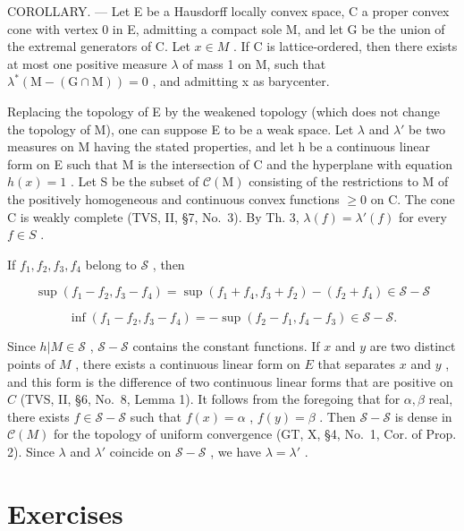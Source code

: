 COROLLARY. --- Let E be a Hausdorff locally convex space, C a proper convex cone with vertex 0 in E, admitting a compact sole M, and let G be the union of the extremal generators of C. Let \(x \in M\) . If C is lattice-ordered, then there exists at most one positive measure \(\lambda\) of mass 1 on M, such that \(\lambda^{*}(\mathrm{M} - (\mathrm{G} \cap \mathrm{M})) = 0\) , and admitting x as barycenter.

Replacing the topology of E by the weakened topology (which does not change the topology of M), one can suppose E to be a weak space. Let \(\lambda\) and \(\lambda'\) be two measures on M having the stated properties, and let h be a continuous linear form on E such that M is the intersection of C and the hyperplane with equation \(h(x)=1\) . Let S be the subset of \(\mathcal{C}(\mathrm{M})\) consisting of the restrictions to M of the positively homogeneous and continuous convex functions \(\geqslant0\) on C. The cone C is weakly complete (TVS, II, §7, No.~3). By Th. 3, \(\lambda(f)=\lambda'(f)\) for every \(f\in S\) .

If \(f_{1}, f_{2}, f_{3}, f_{4}\) belong to \(\mathcal{S}\) , then

\[
\sup \left(f _ {1} - f _ {2}, f _ {3} - f _ {4}\right) = \sup \left(f _ {1} + f _ {4}, f _ {3} + f _ {2}\right) - \left(f _ {2} + f _ {4}\right) \in \mathscr {S} - \mathscr {S}
\]

\[
\inf \left(f _ {1} - f _ {2}, f _ {3} - f _ {4}\right) = - \sup \left(f _ {2} - f _ {1}, f _ {4} - f _ {3}\right) \in \mathscr {S} - \mathscr {S}.
\]

Since \(h|M \in \mathcal{S}\) , \(\mathcal{S} - \mathcal{S}\) contains the constant functions. If \(x\) and \(y\) are two distinct points of \(M\) , there exists a continuous linear form on \(E\) that separates \(x\) and \(y\) , and this form is the difference of two continuous linear forms that are positive on \(C\) (TVS, II, §6, No.~8, Lemma 1). It follows from the foregoing that for \(\alpha, \beta\) real, there exists \(f \in \mathcal{S} - \mathcal{S}\) such that \(f(x) = \alpha\) , \(f(y) = \beta\) . Then \(\mathcal{S} - \mathcal{S}\) is dense in \(\mathcal{C}(M)\) for the topology of uniform convergence (GT, X, §4, No.~1, Cor. of Prop. 2). Since \(\lambda\) and \(\lambda'\) coincide on \(\mathcal{S} - \mathcal{S}\) , we have \(\lambda = \lambda'\) .

\chapter*{Exercises}
{}
\setcounter{exercisegroup}{1}
\edef\CurrentExerciseGroup{\arabic{exercisegroup}}
